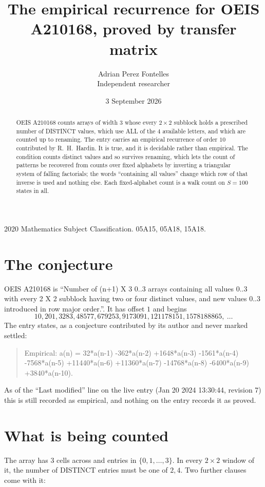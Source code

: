 \documentclass[11pt,a4paper]{article}
\title{The empirical recurrence for OEIS A210168, proved by transfer matrix}
\author{Adrian Perez Fontelles\\ \small Independent researcher}
\date{3 September 2026}
\theoremstyle{plain}
\theoremstyle{definition}
\begin{document}
\maketitle

\begin{abstract}
OEIS A210168 counts arrays of width $3$ whose every $2\times2$ subblock holds a
prescribed number of DISTINCT values, which use ALL of the $4$ available letters, and which
are counted up to renaming. The entry carries an empirical recurrence of order $10$
contributed by R.~H.~Hardin. It is true, and it is decidable rather than empirical. The
condition counts distinct values and so survives renaming, which lets the count of patterns be
recovered from counts over fixed alphabets by inverting a triangular system of falling
factorials; the words ``containing all values'' change which row of that inverse is used and
nothing else. Each fixed-alphabet count is a walk count on $S=100$ states in all.
\end{abstract}

\noindent\small 2020 Mathematics Subject Classification. 05A15, 05A18, 15A18.\normalsize

\section{The conjecture}

OEIS A210168 is ``Number of (n+1) X 3 0..3 arrays containing all values 0..3 with every 2 X 2 subblock having two or four distinct values, and new values 0..3 introduced in row major order.''. It has offset $1$ and begins
\[
10, 201, 3283, 48577, 679253, 9173091, 121178151, 1578188865,\ \dots
\]
The entry states, as a conjecture contributed by its author and never marked settled:
\begin{quote}
Empirical: a(n) = 32*a(n-1) -362*a(n-2) +1648*a(n-3) -1561*a(n-4) -7568*a(n-5) +11440*a(n-6) +11360*a(n-7) -14768*a(n-8) -6400*a(n-9) +3840*a(n-10).
\end{quote}
As of the ``Last modified'' line on the live entry (Jan 20 2024 13:30:44, revision 7) this is still
recorded as empirical, and nothing on the entry records it as proved.

\section{What is being counted}

The array has $3$ cells across and entries in $\{0,1,\dots,3\}$. In every
$2\times2$ window of it, the number of DISTINCT entries must be one of $2, 4$. Two
further clauses come with it:
\end{document}
